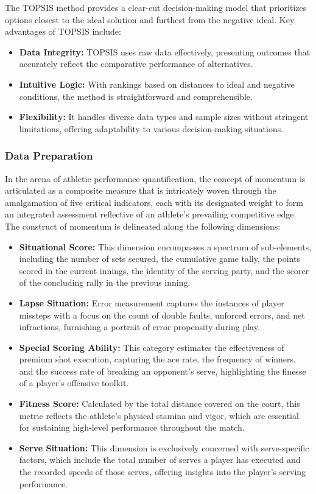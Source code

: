 The TOPSIS method provides a clear-cut decision-making model that prioritizes options closest to the ideal solution and furthest from the negative ideal. Key advantages of TOPSIS include:
\begin{itemize}
    \item \textbf{Data Integrity:}  TOPSIS uses raw data effectively, presenting outcomes that accurately reflect the comparative performance of alternatives.
    \item \textbf{Intuitive Logic:} With rankings based on distances to ideal and negative conditions, the method is straightforward and comprehensible.
    \item \textbf{Flexibility:}  It handles diverse data types and sample sizes without stringent limitations, offering adaptability to various decision-making situations.
\end{itemize}
\subsubsection{Data Preparation}
 In the arena of athletic performance quantification, the concept of momentum is articulated as a composite measure that is intricately woven through the amalgamation of five critical indicators, each with its designated weight to form an integrated assessment reflective of an athlete’s prevailing competitive edge. The construct of momentum is delineated along the following dimensions:
 \begin{itemize}
     \item \textbf{Situational Score:} This dimension encompasses a spectrum of sub-elements, including the number of sets secured, the cumulative game tally, the points scored in the current innings, the identity of the serving party, and the scorer of the concluding rally in the previous inning.
     \item \textbf{Lapse Situation:} Error measurement captures the instances of player missteps with a focus on the count of double faults, unforced errors, and net infractions, furnishing a portrait of error propensity during play.
     \item \textbf{Special Scoring Ability:} This category estimates the effectiveness of premium shot execution, capturing the ace rate, the frequency of winners, and the success rate of breaking an opponent’s serve, highlighting the finesse of a player’s offensive toolkit.
     \item \textbf{Fitness Score:} Calculated by the total distance covered on the court, this metric reflects the athlete’s physical stamina and vigor, which are essential for sustaining high-level performance throughout the match.
     \item \textbf{Serve Situation:} This dimension is exclusively concerned with serve-specific factors, which include the total number of serves a player has executed and the recorded speeds of those serves, offering insights into the player’s serving performance.
 \end{itemize}
